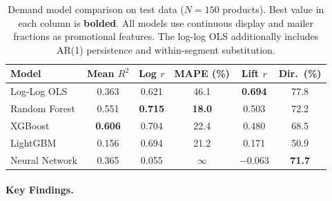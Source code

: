 \documentclass[12pt,a4paper]{article}
\begin{document}
\begin{table}[H]
\centering
\caption{Demand model comparison on test data ($N = 150$ products).
Best value in each column is \textbf{bolded}. All models use
continuous display and mailer fractions as promotional features.
The log-log OLS additionally includes AR(1) persistence and
within-segment substitution.}
\label{tab:model-comparison}
\begin{tabular}{l ccc cc}
\toprule
\textbf{Model} &
\textbf{Mean $R^2$} &
\textbf{Log $r$} &
\textbf{MAPE (\%)} &
\textbf{Lift $r$} &
\textbf{Dir.\ (\%)} \\
\midrule
Log-Log OLS & 0.363 & 0.621 & 46.1 & \textbf{0.694} & 77.8 \\
Random Forest & 0.551 & \textbf{0.715} & \textbf{18.0} & 0.503 & 72.2 \\
XGBoost & \textbf{0.606} & 0.704 & 22.4 & 0.480 & 68.5 \\
LightGBM & 0.156 & 0.694 & 21.2 & 0.171 & 50.9 \\
Neural Network & 0.365 & 0.055 & $\infty$ & $-0.063$ & \textbf{71.7} \\
\bottomrule
\end{tabular}
\end{table}

\paragraph{Key Findings.}
\end{document}
